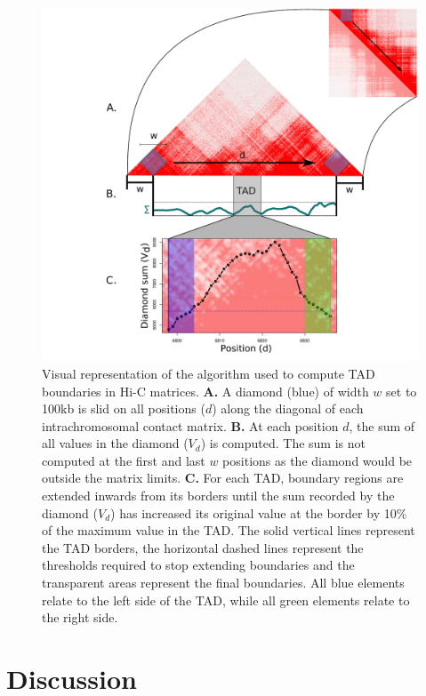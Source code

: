 \documentclass[11pt,a4paper]{report}
\begin{document}
\begin{figure}[ht]
	\includegraphics[width=1\textwidth]{Figures/6_interactions.pdf}
	\caption{Visual representation of the algorithm used to compute TAD boundaries in Hi-C matrices. \textbf{A.} A diamond (blue) of width $w$ set to 100kb is slid on all positions ($d$) along the diagonal of each intrachromosomal contact matrix. \textbf{B.} At each position $d$, the sum of all values in the diamond ($V_d$) is computed. The sum is not computed at the first and last $w$ positions as the diamond would be outside the matrix limits. \textbf{C.} For each TAD, boundary regions are extended inwards from its borders until the sum recorded by the diamond ($V_d$) has increased its original value at the border by 10\% of the maximum value in the TAD. The solid vertical lines represent the TAD borders, the horizontal dashed lines represent the thresholds required to stop extending boundaries and the transparent areas represent the final boundaries. All blue elements relate to the left side of the TAD, while all green elements relate to the right side.}
	\label{interact_hic}
\end{figure}

\FloatBarrier
\section*{Discussion}
\end{document}
